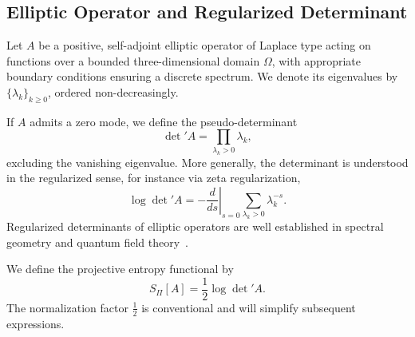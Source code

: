 \subsection{Elliptic Operator and Regularized Determinant}
  \label{subsec:elliptic-operator}

  Let $A$ be a positive, self-adjoint elliptic operator of Laplace type
  acting on functions over a bounded three-dimensional domain $\Omega$,
  with appropriate boundary conditions ensuring a discrete spectrum.
  We denote its eigenvalues by $\{\lambda_k\}_{k \ge 0}$,
  ordered non-decreasingly.

  If $A$ admits a zero mode, we define the pseudo-determinant
  \begin{equation}
    \det{}' A = \prod_{\lambda_k > 0} \lambda_k,
  \end{equation}
  excluding the vanishing eigenvalue.
  More generally, the determinant is understood in the regularized sense,
  for instance via zeta regularization,
  \begin{equation}
    \log \det{}' A = - \left.\frac{d}{ds}\right|_{s=0}
    \sum_{\lambda_k > 0} \lambda_k^{-s}.
  \end{equation}
  Regularized determinants of elliptic operators are well established
  in spectral geometry and quantum field theory~\cite{gilkey1995,vassilevich2003,dowker1976}.

  We define the projective entropy functional by
  \begin{equation}
    S_\Pi[A] = \frac12 \log \det{}' A.
  \end{equation}
  The normalization factor $\tfrac12$ is conventional and will simplify subsequent expressions.
